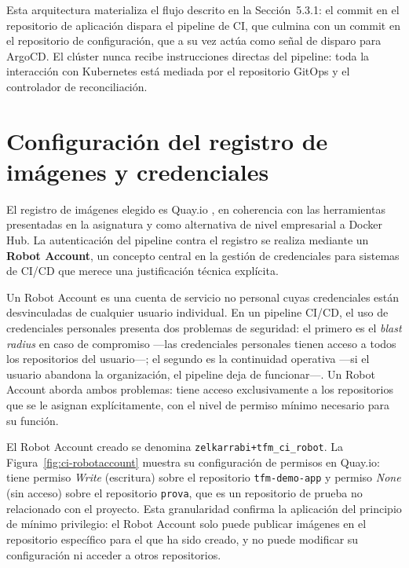 Esta arquitectura materializa el flujo descrito en la Sección~5.3.1: el commit en el repositorio de aplicación dispara el pipeline de CI, que culmina con un commit en el repositorio de configuración, que a su vez actúa como señal de disparo para ArgoCD. El clúster nunca recibe instrucciones directas del pipeline: toda la interacción con Kubernetes está mediada por el repositorio GitOps y el controlador de reconciliación.

\section{Configuración del registro de imágenes y credenciales}

El registro de imágenes elegido es Quay.io \cite{quay_docs}, en coherencia con las herramientas presentadas en la asignatura y como alternativa de nivel empresarial a Docker Hub. La autenticación del pipeline contra el registro se realiza mediante un \textbf{Robot Account}, un concepto central en la gestión de credenciales para sistemas de CI/CD que merece una justificación técnica explícita.

Un Robot Account es una cuenta de servicio no personal cuyas credenciales están desvinculadas de cualquier usuario individual. En un pipeline CI/CD, el uso de credenciales personales presenta dos problemas de seguridad: el primero es el \textit{blast radius} en caso de compromiso ---las credenciales personales tienen acceso a todos los repositorios del usuario---; el segundo es la continuidad operativa ---si el usuario abandona la organización, el pipeline deja de funcionar---. Un Robot Account aborda ambos problemas: tiene acceso exclusivamente a los repositorios que se le asignan explícitamente, con el nivel de permiso mínimo necesario para su función.

El Robot Account creado se denomina \texttt{zelkarrabi+tfm\_ci\_robot}. La Figura~\ref{fig:ci-robotaccount} muestra su configuración de permisos en Quay.io: tiene permiso \textit{Write} (escritura) sobre el repositorio \texttt{tfm-demo-app} y permiso \textit{None} (sin acceso) sobre el repositorio \texttt{prova}, que es un repositorio de prueba no relacionado con el proyecto. Esta granularidad confirma la aplicación del principio de mínimo privilegio: el Robot Account solo puede publicar imágenes en el repositorio específico para el que ha sido creado, y no puede modificar su configuración ni acceder a otros repositorios.


